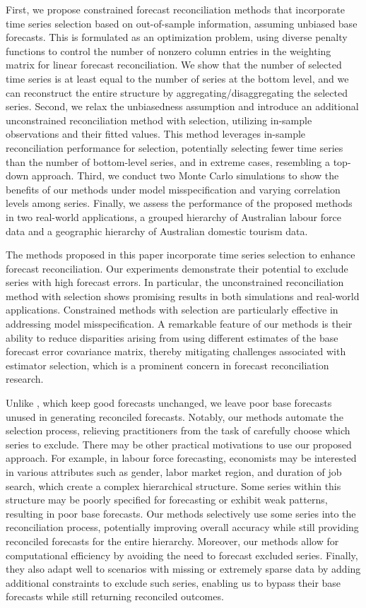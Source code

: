 \documentclass[
  11pt]{article}
\theoremstyle{plain}
\theoremstyle{remark}
\begin{document}
First, we propose constrained forecast reconciliation methods that
incorporate time series selection based on out-of-sample information,
assuming unbiased base forecasts. This is formulated as an optimization
problem, using diverse penalty functions to control the number of
nonzero column entries in the weighting matrix for linear forecast
reconciliation. We show that the number of selected time series is at
least equal to the number of series at the bottom level, and we can
reconstruct the entire structure by aggregating/disaggregating the
selected series. Second, we relax the unbiasedness assumption and
introduce an additional unconstrained reconciliation method with
selection, utilizing in-sample observations and their fitted values.
This method leverages in-sample reconciliation performance for
selection, potentially selecting fewer time series than the number of
bottom-level series, and in extreme cases, resembling a top-down
approach. Third, we conduct two Monte Carlo simulations to show the
benefits of our methods under model misspecification and varying
correlation levels among series. Finally, we assess the performance of
the proposed methods in two real-world applications, a grouped hierarchy
of Australian labour force data and a geographic hierarchy of Australian
domestic tourism data.

The methods proposed in this paper incorporate time series selection to
enhance forecast reconciliation. Our experiments demonstrate their
potential to exclude series with high forecast errors. In particular,
the unconstrained reconciliation method with selection shows promising
results in both simulations and real-world applications. Constrained
methods with selection are particularly effective in addressing model
misspecification. A remarkable feature of our methods is their ability
to reduce disparities arising from using different estimates of the base
forecast error covariance matrix, thereby mitigating challenges
associated with estimator selection, which is a prominent concern in
forecast reconciliation research.

Unlike \citet{Zhang2023-op}, which keep good forecasts unchanged, we
leave poor base forecasts unused in generating reconciled forecasts.
Notably, our methods automate the selection process, relieving
practitioners from the task of carefully choose which series to exclude.
There may be other practical motivations to use our proposed approach.
For example, in labour force forecasting, economists may be interested
in various attributes such as gender, labor market region, and duration
of job search, which create a complex hierarchical structure. Some
series within this structure may be poorly specified for forecasting or
exhibit weak patterns, resulting in poor base forecasts. Our methods
selectively use some series into the reconciliation process, potentially
improving overall accuracy while still providing reconciled forecasts
for the entire hierarchy. Moreover, our methods allow for computational
efficiency by avoiding the need to forecast excluded series. Finally,
they also adapt well to scenarios with missing or extremely sparse data
by adding additional constraints to exclude such series, enabling us to
bypass their base forecasts while still returning reconciled outcomes.
\end{document}
